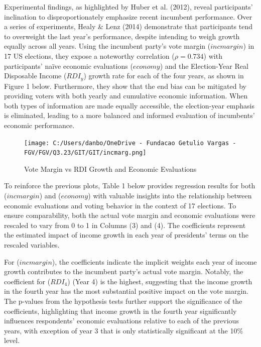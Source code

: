\documentclass[
]{article}
\begin{document}
Experimental findings, as highlighted by Huber et al. (2012), reveal
participants' inclination to disproportionately emphasize recent
incumbent performance. Over a series of experiments, Healy \& Lenz
(2014) demonstrate that participants tend to overweight the last year's
performance, despite intending to weigh growth equally across all years.
Using the incumbent party's vote margin (\(incmargin\)) in 17 US
elections, they expose a noteworthy correlation (\(\rho = 0.734\)) with
participants' naïve economic evaluations (\(economy\)) and the
Election-Year Real Disposable Income (\(RDI_y\)) growth rate for each of
the four years, as shown in Figure 1 below. Furthermore, they show that
the end bias can be mitigated by providing voters with both yearly and
cumulative economic information. When both types of information are made
equally accessible, the election-year emphasis is eliminated, leading to
a more balanced and informed evaluation of incumbents' economic
performance.

\begin{figure}
\hypertarget{fig:label}{%
\centering
\texttt{[image: C:/Users/danbo/OneDrive - Fundacao Getulio Vargas - FGV/FGV/Q3.23/GIT/GIT/incmarg.png]}
\caption{Vote Margin vs RDI Growth and Economic
Evaluations}\label{fig:label}
}
\end{figure}

To reinforce the previous plots, Table 1 below provides regression
results for both (\(incmargin\)) and (\(economy\)) with valuable
insights into the relationship between economic evaluations and voting
behavior in the context of 17 elections. To ensure comparability, both
the actual vote margin and economic evaluations were rescaled to vary
from 0 to 1 in Columns (3) and (4). The coefficients represent the
estimated impact of income growth in each year of presidents' terms on
the rescaled variables.

For (\(incmargin\)), the coefficients indicate the implicit weights each
year of income growth contributes to the incumbent party's actual vote
margin. Notably, the coefficient for (\(RDI_4\)) (Year 4) is the
highest, suggesting that the income growth in the fourth year has the
most substantial positive impact on the vote margin. The p-values from
the hypothesis tests further support the significance of the
coefficients, highlighting that income growth in the fourth year
significantly influences respondents' economic evaluations relative to
each of the previous years, with exception of year 3 that is only
statistically significant at the 10\% level.
\end{document}
